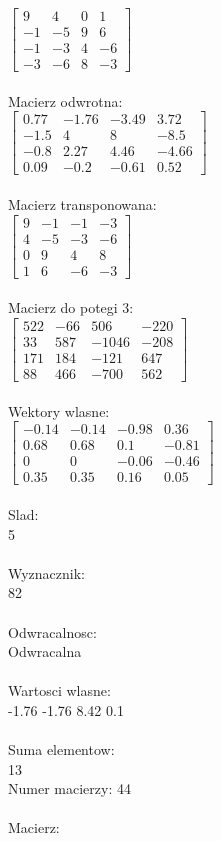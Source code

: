 \documentclass[a4paper,12pt]{article}
\begin{document}
$\begin{bmatrix} 9&4&0&1\\-1&-5&9&6\\-1&-3&4&-6\\-3&-6&8&-3 \end{bmatrix}$
\\
\\
Macierz odwrotna:\\

$\begin{bmatrix} 0.77&-1.76&-3.49&3.72\\-1.5&4&8&-8.5\\-0.8&2.27&4.46&-4.66\\0.09&-0.2&-0.61&0.52 \end{bmatrix}$
\\
\\
Macierz transponowana:\\

$\begin{bmatrix} 9&-1&-1&-3\\4&-5&-3&-6\\0&9&4&8\\1&6&-6&-3 \end{bmatrix}$
\\
\\
Macierz do potegi 3:\\

$\begin{bmatrix} 522&-66&506&-220\\33&587&-1046&-208\\171&184&-121&647\\88&466&-700&562 \end{bmatrix}$
\\
\\
Wektory wlasne:\\

$\begin{bmatrix} -0.14&-0.14&-0.98&0.36\\0.68&0.68&0.1&-0.81\\0&0&-0.06&-0.46\\0.35&0.35&0.16&0.05 \end{bmatrix}$
\\
\\
Slad:\\
5
\\
\\
Wyznacznik:\\
82
\\
\\
Odwracalnosc:\\
Odwracalna
\\
\\
Wartosci wlasne:\\
-1.76 -1.76 8.42 0.1
\\
\\
Suma elementow:\\
13
\\
\newpage
Numer macierzy:
44
\\
\\
Macierz:\\
\end{document}
